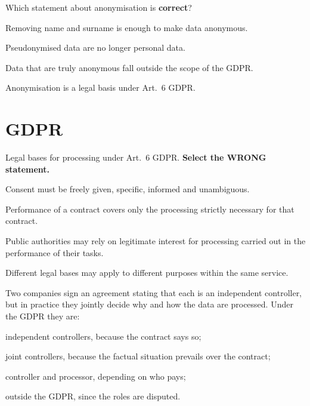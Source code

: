 \begin{domanda}\label{q:anonimi}
Which statement about anonymisation is \textbf{correct}?
\begin{opzioni}
  \item Removing name and surname is enough to make data anonymous.
  \item Pseudonymised data are no longer personal data.
  \item Data that are truly anonymous fall outside the scope of the GDPR.
  \item Anonymisation is a legal basis under Art.~6 GDPR.
\end{opzioni}
\end{domanda}

\section{GDPR}

\begin{domanda}\label{q:gdpr-basi}
Legal bases for processing under Art.~6 GDPR. \textbf{Select the WRONG statement.}
\begin{opzioni}
  \item Consent must be freely given, specific, informed and unambiguous.
  \item Performance of a contract covers only the processing strictly necessary for that contract.
  \item Public authorities may rely on legitimate interest for processing carried out in the
    performance of their tasks.
  \item Different legal bases may apply to different purposes within the same service.
\end{opzioni}
\end{domanda}

\begin{domanda}\label{q:ruoli-fatto}
Two companies sign an agreement stating that each is an independent controller, but in practice they
jointly decide why and how the data are processed. Under the GDPR they are:
\begin{opzioni}
  \item independent controllers, because the contract says so;
  \item joint controllers, because the factual situation prevails over the contract;
  \item controller and processor, depending on who pays;
  \item outside the GDPR, since the roles are disputed.
\end{opzioni}
\end{domanda}

